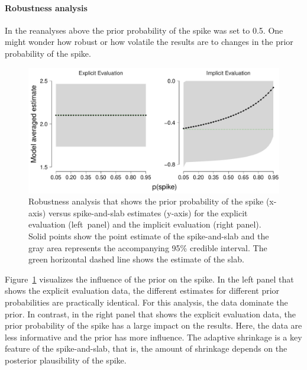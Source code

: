 \documentclass[a4paper]{article}
\newenvironment{revision}{\color{teal}}{\color{black}}
\begin{document}
\begin{revision}
\paragraph{Robustness analysis}
In the reanalyses above the prior probability of the spike was set to 0.5. One might wonder how robust or how volatile the results are to changes in the prior probability of the spike.
\begin{figure}[!ht]
	\centering
	\includegraphics[width=\textwidth]{robustnessReanalysis_big_font.pdf}
	\caption{%
		Robustness analysis that shows the prior probability of the spike (x-axis) versus spike-and-slab estimates (y-axis) for the explicit evaluation (left~panel) and the implicit evaluation (right panel).
		Solid points show the point estimate of the spike-and-slab and the gray area represents the accompanying 95\% credible interval.
		The green horizontal dashed line shows the estimate of the slab.
	}
	\label{fig:robustnessReanalysis}
\end{figure}
Figure~\ref{fig:robustnessReanalysis} visualizes the influence of the prior on the spike. 
In the left panel that shows the explicit evaluation data, the different estimates for different prior probabilities are practically identical. 
For this analysis, the data dominate the prior.
In contrast, in the right panel that shows the explicit evaluation data, the prior probability of the spike has a large impact on the results.
Here, the data are less informative and the prior has more influence.
The adaptive shrinkage is a key feature of the spike-and-slab, that is, the amount of shrinkage depends on the posterior plausibility of the spike.
\end{revision}
\end{document}
